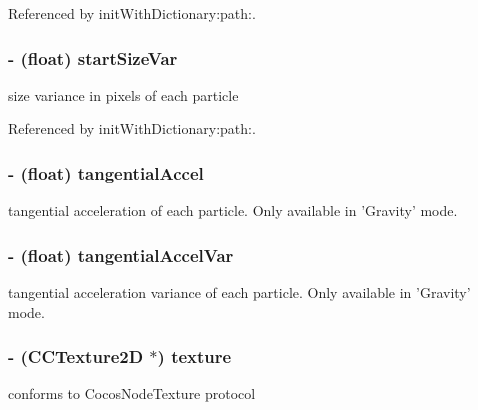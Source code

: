 Referenced by init\-With\-Dictionary\-:path\-:.

\hypertarget{interface_c_c_particle_system_a465fb02238f5879495fee1f5be1de27f}{
\subsubsection[{start\-Size\-Var}]{\setlength{\rightskip}{0pt plus 5cm}-\/ (float) {\bf start\-Size\-Var}}}\label{interface_c_c_particle_system_a465fb02238f5879495fee1f5be1de27f}
size variance in pixels of each particle 

Referenced by init\-With\-Dictionary\-:path\-:.

\hypertarget{interface_c_c_particle_system_a3bd406cacdb59df7e672ee3ef8fe1a60}{
\subsubsection[{tangential\-Accel}]{\setlength{\rightskip}{0pt plus 5cm}-\/ (float) {\bf tangential\-Accel}}}\label{interface_c_c_particle_system_a3bd406cacdb59df7e672ee3ef8fe1a60}
tangential acceleration of each particle. Only available in 'Gravity' mode. \hypertarget{interface_c_c_particle_system_ab73717872b1cbbe4d546e38c86c5f116}{
\subsubsection[{tangential\-Accel\-Var}]{\setlength{\rightskip}{0pt plus 5cm}-\/ (float) {\bf tangential\-Accel\-Var}}}\label{interface_c_c_particle_system_ab73717872b1cbbe4d546e38c86c5f116}
tangential acceleration variance of each particle. Only available in 'Gravity' mode. \hypertarget{interface_c_c_particle_system_a36f3e14e4bef6d369e9a70808027a4f4}{
\subsubsection[{texture}]{\setlength{\rightskip}{0pt plus 5cm}-\/ ({\bf C\-C\-Texture2\-D} $\ast$) {\bf texture}}}\label{interface_c_c_particle_system_a36f3e14e4bef6d369e9a70808027a4f4}
conforms to Cocos\-Node\-Texture protocol 

